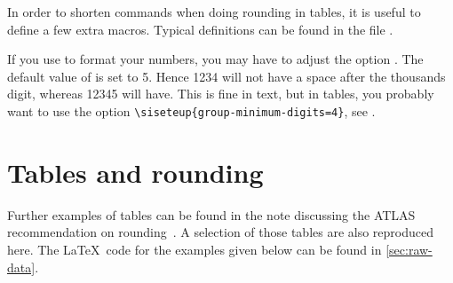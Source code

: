 \documentclass[REPORT=false, UKenglish]{atlasdoc}
\begin{document}
In order to shorten commands when doing rounding in tables, it is useful to define a few extra macros.
Typical definitions can be found in the file .

If you use  to format your numbers,
you may have to adjust the option .
 The default value of  is set to 5.
Hence \num{1234} will not have a space after the thousands digit,
whereas \num{12345} will have.
This is fine in text, but in tables, you probably want to use the option
\verb|\siseteup{group-minimum-digits=4}|,
see .

\begin{table}[htbp]
\begin{tcblisting}{}
  \caption{Tables comparing different  values
  for the package .}
  \label{tab:minimum-digits}
  \centering
  \qquad
\end{tcblisting}
\end{table}


\section{Tables and rounding}

Further examples of tables can be found in the note discussing the ATLAS recommendation on rounding~\cite{atlas-rounding}.
A selection of those tables are also reproduced here.
The \LaTeX\ code for the examples given below can be found in \cref{sec:raw-data}.
\end{document}
